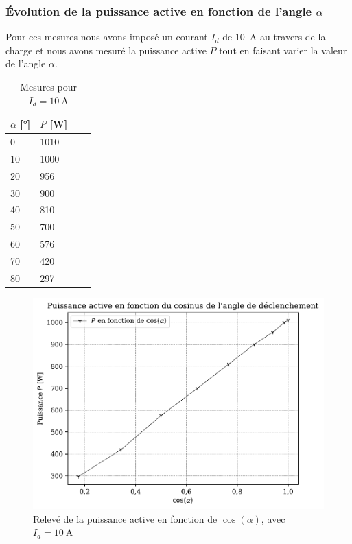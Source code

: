 \documentclass[a4paper, 11pt, openany, oneside, french]{article}
\begin{document}
\clearpage
\subsubsection{Évolution de la puissance active en fonction de l'angle $\alpha$}

Pour ces mesures nous avons imposé un courant $I_d$ de \SI{10}{\ampere} au travers de la charge et nous avons mesuré la puissance active $P$ tout en faisant varier la valeur de l'angle $\alpha$.

\begin{table}[!ht]
\centering
\begin{tabular}{llll}
\toprule
$\alpha$ [\si{\degree}] & $P$ [\si{\watt}]\\
\midrule
0             & 1010                  \\
10            & 1000                  \\
20            & 956                   \\
30            & 900                   \\
40            & 810                   \\
50            & 700                   \\
60            & 576                   \\
70            & 420                   \\
80            & 297                   \\
\bottomrule
\end{tabular}
\caption{Mesures pour $I_d = \SI{10}{\ampere}$}
\end{table}

\begin{figure}[!ht]
    \centering
    \includegraphics[width=0.8\linewidth]{exp1_graph5}
    \caption{Relevé de la puissance active en fonction de $\cos{\left(\alpha \right)}$, avec $I_d = \SI{10}{\ampere}$}
    \label{fig:exp1grap5}
\end{figure}
\end{document}
